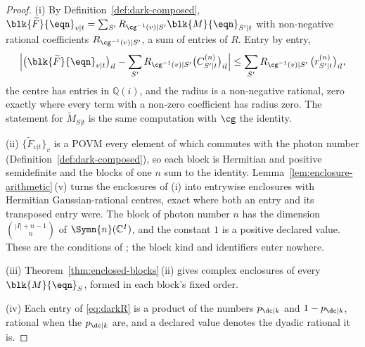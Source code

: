 \begin{proof}
(i) By Definition~\ref{def:dark-composed},
$\blk{\widetilde F}{\eqn}_{v|t}=\sum_{S'}R_{\cg^{-1}(v)|S'}\blk{M}{\eqn}_{S'|t}$
with non-negative rational coefficients $R_{\cg^{-1}(v)|S'}$, a sum of
entries of $R$. Entry by entry,
\begin{equation*}
  \Big\lvert\big(\blk{\widetilde F}{\eqn}_{v|t}\big)_{il}
   -\sum_{S'}R_{\cg^{-1}(v)|S'}\big(C^{(n)}_{S'|t}\big)_{il}\Big\rvert
  \le\sum_{S'}R_{\cg^{-1}(v)|S'}\,\big(r^{(n)}_{S'|t}\big)_{il} ,
\end{equation*}
the centre has entries in $\mathbb{Q}(i)$, and the radius is a non-negative
rational, zero exactly where every term with a non-zero coefficient has radius
zero. The statement for $\widetilde M_{S|t}$ is the same computation with
$\cg$ the identity.

(ii) $\{\widetilde F_{v|t}\}_v$ is a POVM every element of which commutes with
the photon number (Definition~\ref{def:dark-composed}), so each block is
Hermitian and positive semidefinite and the blocks of one $n$ sum to the
identity. Lemma~\ref{lem:enclosure-arithmetic}\,(v) turns the enclosures of
(i) into entrywise enclosures with Hermitian Gaussian-rational centres, exact
where both an entry and its transposed entry were. The block of photon number
$n$ has the dimension $\binom{|I|+n-1}{n}$ of $\Symn{n}(\mathbb{C}^{I})$, and
the constant $1$ is a positive declared value. These are the conditions of
; the block kind and identifiers enter
nowhere.

(iii) Theorem~\ref{thm:enclosed-blocks}\,(ii) gives complex enclosures of
every $\blk{M}{\eqn}_S$, formed in each block's fixed order.

(iv) Each entry of \eqref{eq:darkR} is a product of the numbers $p_{\dc|k}$
and $1-p_{\dc|k}$, rational when the $p_{\dc|k}$ are, and a declared value
denotes the dyadic rational it is.
\end{proof}

